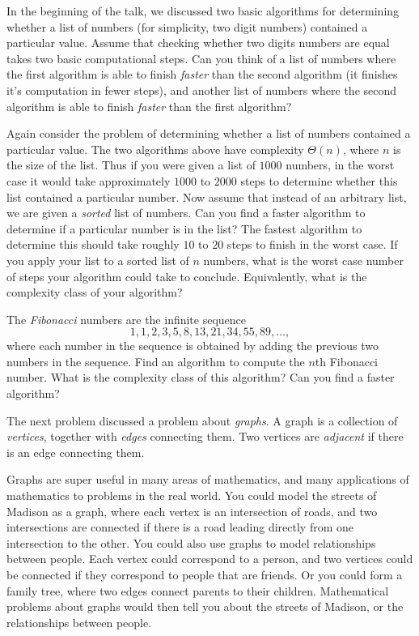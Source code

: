 \documentclass[answers]{exam}
\begin{document}
\begin{questions}

\question In the beginning of the talk, we discussed two basic algorithms for determining whether a list of numbers (for simplicity, two digit numbers) contained a particular value. Assume that checking whether two digits numbers are equal takes two basic computational steps. Can you think of a list of numbers where the first algorithm is able to finish \emph{faster} than the second algorithm (it finishes it's computation in fewer steps), and another list of numbers where the second algorithm is able to finish \emph{faster} than the first algorithm?

\question Again consider the problem of determining whether a list of numbers contained a particular value. The two algorithms above have complexity $\Theta(n)$, where $n$ is the size of the list. Thus if you were given a list of $1000$ numbers, in the worst case it would take approximately $1000$ to $2000$ steps to determine whether this list contained a particular number. Now assume that instead of an arbitrary list, we are given a \emph{sorted} list of numbers. Can you find a faster algorithm to determine if a particular number is in the list? The fastest algorithm to determine this should take roughly $10$ to $20$ steps to finish in the worst case. If you apply your list to a sorted list of $n$ numbers, what is the worst case number of steps your algorithm could take to conclude. Equivalently, what is the complexity class of your algorithm? 

\question The \emph{Fibonacci} numbers are the infinite sequence
%
\[ 1,1,2,3,5,8,13,21,34,55,89,\dots, \]
%
where each number in the sequence is obtained by adding the previous two numbers in the sequence. Find an algorithm to compute the $n$th Fibonacci number. What is the complexity class of this algorithm? Can you find a faster algorithm?

\question The next problem discussed a problem about \emph{graphs}. A graph is a collection of \emph{vertices}, together with \emph{edges} connecting them. Two vertices are \emph{adjacent} if there is an edge connecting them.

\vspace{4em}

\vspace{4em}

Graphs are super useful in many areas of mathematics, and many applications of mathematics to problems in the real world. You could model the streets of Madison as a graph, where each vertex is an intersection of roads, and two intersections are connected if there is a road leading directly from one intersection to the other. You could also use graphs to model relationships between people. Each vertex could correspond to a person, and two vertices could be connected if they correspond to people that are friends. Or you could form a family tree, where two edges connect parents to their children. Mathematical problems about graphs would then tell you about the streets of Madison, or the relationships between people.


\end{questions}
\end{document}
